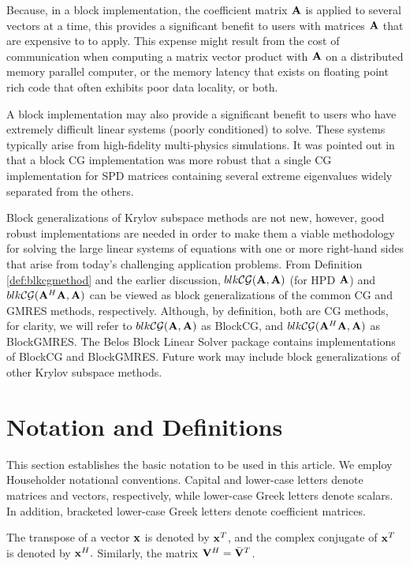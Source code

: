 \documentclass{article}
\newcommand{\bA}{{\bf A}}
\newcommand{\bV}{{\bf V}}
\begin{document}
Because, in a block implementation, the coefficient matrix $\bA$
is applied to several vectors at a time, this provides a
significant benefit to users with matrices $\bA$ that are
expensive to to apply. This expense might result from the cost of
communication when computing a matrix vector product with $\bA$ on
a distributed memory parallel computer, or the memory latency that
exists on floating point rich code that often exhibits poor data
locality, or both.

A block implementation may also provide a significant benefit to
users who have extremely difficult linear systems (poorly
conditioned) to solve. These systems typically arise from
high-fidelity multi-physics simulations. It was pointed out in
\cite{Ol80}  that a block CG implementation was more robust that a
single CG implementation for SPD matrices containing several
extreme eigenvalues widely separated from the others.

Block generalizations of Krylov subspace methods are not new,
however, good robust implementations are needed in order to make
them a viable methodology for solving the large linear systems of
equations with one or more right-hand sides that arise from
today's challenging application problems. From Definition
\ref{def:blkcgmethod} and the earlier discussion, $blk{\cal
CG}(\bA, \bA)$ (for HPD $\bA$) and $blk{\cal CG}(\bA^H \bA, \bA)$
can be viewed as block generalizations of the common CG and GMRES
methods, respectively. Although, by definition, both are CG
methods, for clarity, we will refer to $blk{\cal CG}(\bA, \bA)$ as
BlockCG, and $blk{\cal CG}(\bA^H \bA, \bA)$ as BlockGMRES. The
Belos Block Linear Solver package contains implementations of
BlockCG and BlockGMRES. Future work may include block
generalizations of other Krylov subspace methods.


\section{Notation and Definitions}
\label{sec:notation}

This section establishes the basic notation to be used in this
article. We employ Householder notational conventions. Capital and
lower-case letters denote matrices and vectors, respectively,
while lower-case Greek letters denote scalars. In addition,
bracketed lower-case Greek letters denote coefficient matrices.

The transpose of a vector ${\bf x}$ is denoted by ${\bf x}^T$, and
the complex conjugate of ${\bf x}^T$ is denoted by ${\bf x}^H.$
Similarly, the matrix $\bV^H = {\bar \bV}^T$.
\end{document}
